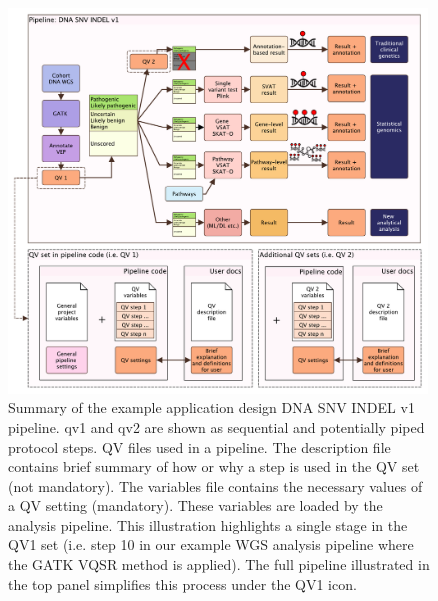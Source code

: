 \begin{figure}[h]
    \centering
   \includegraphics[width=0.99\textwidth]{./images/qv_pipeline_with_file_vcurrent.pdf}
    \caption{Summary of the example application design DNA SNV INDEL v1 pipeline. \ac{qv}1 and \ac{qv}2 are shown as sequential and potentially piped protocol steps.
    QV files used in a pipeline. The description file contains brief summary of how or why a step is used in the QV set (not mandatory). The variables file contains the necessary values of a QV setting (mandatory). These variables are loaded by the analysis pipeline. This illustration highlights a single stage in the QV1 set (i.e. step 10 in our example WGS analysis pipeline where the GATK VQSR method is applied). The full pipeline illustrated in the top panel simplifies this process under the QV1 icon.
    }
    \label{fig:qv_pipeline_with_file_vcurrent}
\end{figure}

